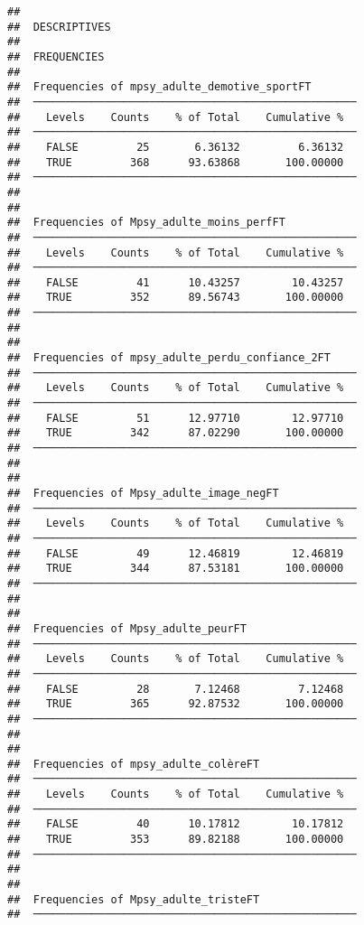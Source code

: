 \documentclass[
]{article}
\begin{document}
\begin{verbatim}
## 
##  DESCRIPTIVES
## 
##  FREQUENCIES
## 
##  Frequencies of mpsy_adulte_demotive_sportFT        
##  ────────────────────────────────────────────────── 
##    Levels    Counts    % of Total    Cumulative %   
##  ────────────────────────────────────────────────── 
##    FALSE         25       6.36132         6.36132   
##    TRUE         368      93.63868       100.00000   
##  ────────────────────────────────────────────────── 
## 
## 
##  Frequencies of Mpsy_adulte_moins_perfFT            
##  ────────────────────────────────────────────────── 
##    Levels    Counts    % of Total    Cumulative %   
##  ────────────────────────────────────────────────── 
##    FALSE         41      10.43257        10.43257   
##    TRUE         352      89.56743       100.00000   
##  ────────────────────────────────────────────────── 
## 
## 
##  Frequencies of mpsy_adulte_perdu_confiance_2FT     
##  ────────────────────────────────────────────────── 
##    Levels    Counts    % of Total    Cumulative %   
##  ────────────────────────────────────────────────── 
##    FALSE         51      12.97710        12.97710   
##    TRUE         342      87.02290       100.00000   
##  ────────────────────────────────────────────────── 
## 
## 
##  Frequencies of Mpsy_adulte_image_negFT             
##  ────────────────────────────────────────────────── 
##    Levels    Counts    % of Total    Cumulative %   
##  ────────────────────────────────────────────────── 
##    FALSE         49      12.46819        12.46819   
##    TRUE         344      87.53181       100.00000   
##  ────────────────────────────────────────────────── 
## 
## 
##  Frequencies of Mpsy_adulte_peurFT                  
##  ────────────────────────────────────────────────── 
##    Levels    Counts    % of Total    Cumulative %   
##  ────────────────────────────────────────────────── 
##    FALSE         28       7.12468         7.12468   
##    TRUE         365      92.87532       100.00000   
##  ────────────────────────────────────────────────── 
## 
## 
##  Frequencies of mpsy_adulte_colèreFT                
##  ────────────────────────────────────────────────── 
##    Levels    Counts    % of Total    Cumulative %   
##  ────────────────────────────────────────────────── 
##    FALSE         40      10.17812        10.17812   
##    TRUE         353      89.82188       100.00000   
##  ────────────────────────────────────────────────── 
## 
## 
##  Frequencies of Mpsy_adulte_tristeFT                
##  ────────────────────────────────────────────────── 

\end{verbatim}
\end{document}
